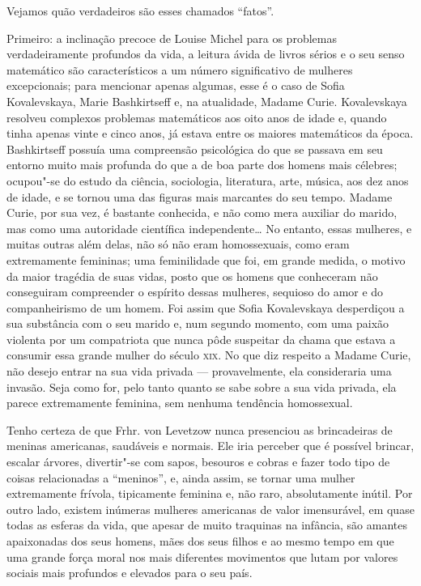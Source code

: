 Vejamos quão verdadeiros são esses chamados ``fatos''.

Primeiro: a inclinação precoce de Louise Michel para os problemas
verdadeiramente profundos da vida, a leitura ávida de livros sérios e o
seu senso matemático são característicos a um número significativo de
mulheres excepcionais; para mencionar apenas algumas, esse é o caso de
Sofia Kovalevskaya, Marie Bashkirtseff e, na atualidade, Madame Curie.
Kovalevskaya resolveu complexos problemas matemáticos aos oito anos de
idade e, quando tinha apenas vinte e cinco anos, já estava entre os
maiores matemáticos da época. Bashkirtseff possuía uma compreensão
psicológica do que se passava em seu entorno muito mais profunda do que a de
boa parte dos homens mais célebres; ocupou"-se do estudo da ciência,
sociologia, literatura, arte, música, aos dez anos de idade, e se tornou
uma das figuras mais marcantes do seu tempo. Madame Curie, por sua vez,
é bastante conhecida, e não como mera auxiliar do marido, mas como uma
autoridade científica independente\ldots{} No entanto, essas mulheres, e
muitas outras além delas, não só não eram homossexuais, como eram
extremamente femininas; uma feminilidade que foi, em grande medida, o
motivo da maior tragédia de suas vidas, posto que os homens que
conheceram não conseguiram compreender o espírito dessas mulheres,
sequioso do amor e do companheirismo de um homem. Foi assim que Sofia
Kovalevskaya desperdiçou a sua substância com o seu marido e, num
segundo momento, com uma paixão violenta por um compatriota que nunca
pôde suspeitar da chama que estava a consumir essa grande mulher do
século \textsc{xix}. No que diz respeito a Madame Curie, não desejo entrar na sua
vida privada --- provavelmente, ela consideraria uma invasão. Seja como
for, pelo tanto quanto se sabe sobre a sua vida privada, ela parece
extremamente feminina, sem nenhuma tendência homossexual.

Tenho certeza de que Frhr. von Levetzow nunca presenciou as brincadeiras de meninas americanas, saudáveis e normais. Ele iria perceber que é
possível brincar, escalar árvores, divertir"-se com sapos, besouros e
cobras e fazer todo tipo de coisas relacionadas a ``meninos'', e, ainda
assim, se tornar uma mulher extremamente frívola, tipicamente feminina
e, não raro, absolutamente inútil. Por outro lado, existem inúmeras
mulheres americanas de valor imensurável, em quase todas as esferas da
vida, que apesar de muito traquinas na infância, são amantes apaixonadas
dos seus homens, mães dos seus filhos e ao mesmo tempo em que uma grande
força moral nos mais diferentes movimentos que lutam por valores sociais
mais profundos e elevados para o seu país.

